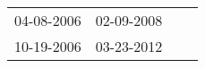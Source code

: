 \begin{supertabular}{llll}
 04-08-2006 &  02-09-2008 \\
 10-19-2006 &  03-23-2012 \\
\end{supertabular}
